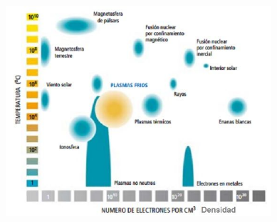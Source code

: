     \begin{figure}[h]
        \centering
        \includegraphics[height=7.8cm]{assets/figures/plasma.jpg}  
    \end{figure}
